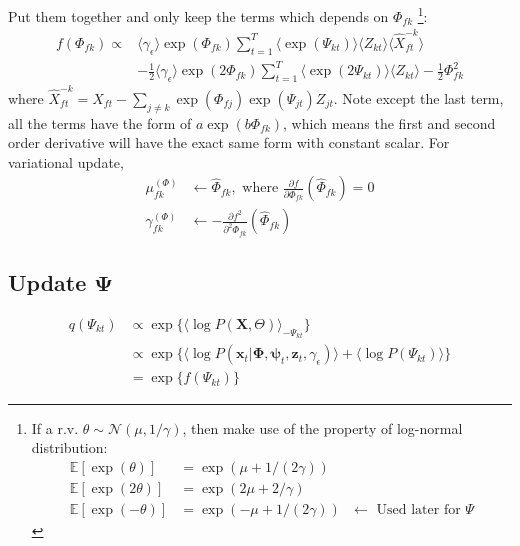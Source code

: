 \documentclass[11pt]{article} %
\begin{document}
Put them together and only keep the terms which depends on $\Phi_{fk}$ \footnote{If a r.v. $\theta \sim \mathcal{N}(\mu, 1/\gamma)$, then make use of the property of log-normal distribution:
\begin{align*}
\mathbb{E}[\exp(\theta)]  &= \exp(\mu + 1/(2\gamma))\\
\mathbb{E}[\exp(2\theta)] &= \exp(2\mu + 2/\gamma)\\
\mathbb{E}[\exp(-\theta)] &= \exp(-\mu + 1/(2\gamma)) \text{ $\leftarrow$ Used later for $\Psi$}
\end{align*}
}:
\begin{align*}
f(\Phi_{fk}) \propto & \langle \gamma_{\epsilon} \rangle \exp(\Phi_{fk}) \sum_{t=1}^T \langle \exp(\Psi_{kt}) \rangle \langle Z_{kt} \rangle
\langle \hat{X}_{ft}^{-k} \rangle \\
& -\frac{1}{2}  \langle \gamma_{\epsilon} \rangle \exp(2\Phi_{fk}) \sum_{t=1}^T \langle \exp(2\Psi_{kt}) \rangle \langle Z_{kt} \rangle - \frac{1}{2}\Phi_{fk}^2
\end{align*}
where $\hat{X}_{ft}^{-k}  = X_{ft} - \sum_{j\neq k}  \exp(\Phi_{fj}) \exp(\Psi_{jt}) Z_{jt}$. Note except the last term, all the terms have the form of $a\exp(b \Phi_{fk})$, which means the first and second order derivative will have the exact same form with constant scalar. For variational update,
\begin{align*}
\mu_{fk}^{(\Phi)} &\leftarrow \hat{\Phi}_{fk}, \text{ where }  \frac{\partial f}{\partial \Phi_{fk}} (\hat{\Phi}_{fk}) = 0 \\
\gamma_{fk}^{(\Phi)} &\leftarrow -\frac{\partial f^2}{\partial^2 \Phi_{fk}} (\hat{\Phi}_{fk})
\end{align*}

\subsection{Update $\mathbf{\Psi}$}
\begin{align*}
q(\Psi_{kt}) &\propto \exp\{\langle\log P(\mathbf{X}, \Theta)\rangle_{-\Psi_{kt}}\}\\
&\propto \exp\{\langle \log P(\bm{x}_t | \mathbf{\Phi}, \bm{\psi}_t, \mathbf{z}_t, \gamma_\epsilon)\rangle + \langle \log P(\Psi_{kt}) \rangle\}\\
&= \exp\{f(\Psi_{kt})\}
\end{align*}
\end{document}
